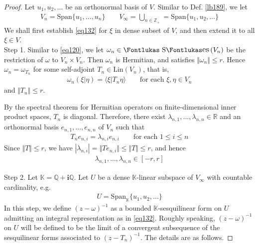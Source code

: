 \documentclass[12pt,b5paper,notitlepage]{article}
\theoremstyle{definition}
\theoremstyle{plain}
\DeclareMathOperator{\Ses}{\text{\Fontlukas S}\text{\kern -0pt {\Fontlukas\large es}}\,}
\newcommand{\Span}{\mathrm{Span}}
\newcommand{\bk}[1]{\langle {#1}\rangle}
\newcommand{\im}{\mathbf{i}}
\newcommand{\Kbb}{\mathbb K}
\newcommand{\Zbb}{\mathbb Z}
\newcommand{\Qbb}{\mathbb Q}
\newcommand{\Rbb}{\mathbb R}
\newcommand{\Lin}{\mathrm{Lin}}
\numberwithin{equation}{section}
\begin{document}
\begin{proof}
Let $u_1,u_2,\dots$ be an orthonormal basis of $V$. Similar to Def. \ref{lb189}, we let
\begin{align*}
V_n=\Span\{u_1,\dots,u_n\}\qquad V_\infty=\bigcup_{n\in\Zbb_+}=\Span\{u_1,u_2,\dots\}
\end{align*}
We shall first establish \eqref{eq132} for $\xi$ in dense subset of $V$, and then extend it to all $\xi\in V$.\\[-1ex]



Step 1. Similar to \eqref{eq120}, we let $\omega_n\in\Ses(V_n)$ be the restriction of $\omega$ to $V_n\times V_n$. Then $\omega_n$ is Hermitian, and satisfies $\Vert\omega_n\Vert\leq r$. Hence $\omega_n=\omega_{T_n}$ for some self-adjoint $T_n\in\Lin(V_n)$, that is,
\begin{align*}
\omega_n(\xi|\eta)=\bk{\xi|T_n\eta}\qquad\text{for each }\xi,\eta\in V_n
\end{align*}
and $\Vert T_n\Vert\leq r$.

By the spectral theorem for Hermitian operators on finite-dimensional inner product spaces, $T_n$ is diagonal. Therefore, there exist $\lambda_{n,1},\dots,\lambda_{n,n}\in\Rbb$ and an orthonormal basis $e_{n,1},\dots,e_{n,n}$ of $V_n$ such that
\begin{align*}
T_ne_{n,i}=\lambda_{n,i}e_{n,i}\qquad\text{for each }1\leq i\leq n
\end{align*}
Since $\Vert T\Vert\leq r$, we have $|\lambda_{n,i}|=\Vert Te_{n,i}\Vert\leq\Vert T\Vert\leq r$, and hence
\begin{align*}
\lambda_{n,1},\dots,\lambda_{n,n}\in [-r,r]
\end{align*}


Step 2. Let $\Kbb=\Qbb+\im\Qbb$. Let $U$ be a dense $\Kbb$-linear subspace of $V_\infty$ with countable cardinality, e.g.
\begin{align*}
U=\Span_\Kbb\{u_1,u_2,\dots\}
\end{align*}
In this step, we define $(z-\omega)^{-1}$ as a bounded $\Kbb$-sesquilinear form on $U$ admitting an integral representation as in \eqref{eq132}. Roughly speaking, $(z-\omega)^{-1}$ on $U$ will be defined to be the limit of a convergent subsequence of the sesquilinear forms associated to $(z-T_n)^{-1}$. The details are as follows.


\end{proof}
\end{document}
